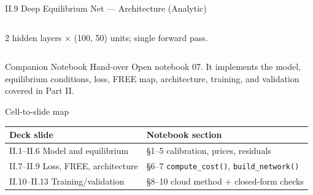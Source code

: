 \documentclass[aspectratio=169,11pt]{beamer}
\newcommand{\emphc}[1]{\textcolor{harvardcrimson}{#1}}
\begin{document}
\begin{frame}{II.9 Deep Equilibrium Net --- Architecture (Analytic)}
\begin{columns}[T,totalwidth=0.96\textwidth]

{\footnotesize 2 hidden layers $\times$ (100, 50) units; single forward pass.}
\end{columns}
\end{frame}


\begin{frame}{Companion Notebook Hand-over}
\scriptsize
\emphc{Open notebook 07.}  It implements the model, equilibrium conditions, loss, FREE map, architecture, training, and validation covered in Part II.
\vspace{-2pt}
\begin{block}{Cell-to-slide map}
\vspace{-4pt}
\begin{center}\renewcommand{\arraystretch}{0.85}
{\scriptsize
\begin{tabular}{ll}
\toprule
\textbf{Deck slide} & \textbf{Notebook section} \\
\midrule
II.1--II.6 Model and equilibrium        & \S 1--5 \;calibration, prices, residuals \\
II.7--II.9 Loss, FREE, architecture     & \S 6--7 \;\texttt{compute\_cost()}, \texttt{build\_network()} \\
II.10--II.13 Training/validation        & \S 8--10 \;cloud method + closed-form checks \\
\bottomrule
\end{tabular}}
\end{center}
\vspace{-4pt}
\end{block}
\end{frame}
\end{document}
